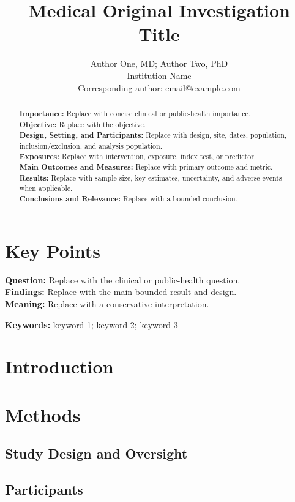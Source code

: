 \documentclass[11pt]{article}
\title{Medical Original Investigation Title}
\author{Author One, MD; Author Two, PhD\\Institution Name\\Corresponding author: email@example.com}
\date{}
\begin{document}
\maketitle

\section*{Key Points}
\textbf{Question:} Replace with the clinical or public-health question.\\
\textbf{Findings:} Replace with the main bounded result and design.\\
\textbf{Meaning:} Replace with a conservative interpretation.

\begin{abstract}
\textbf{Importance:} Replace with concise clinical or public-health importance.\\
\textbf{Objective:} Replace with the objective.\\
\textbf{Design, Setting, and Participants:} Replace with design, site, dates, population, inclusion/exclusion, and analysis population.\\
\textbf{Exposures:} Replace with intervention, exposure, index test, or predictor.\\
\textbf{Main Outcomes and Measures:} Replace with primary outcome and metric.\\
\textbf{Results:} Replace with sample size, key estimates, uncertainty, and adverse events when applicable.\\
\textbf{Conclusions and Relevance:} Replace with a bounded conclusion.
\end{abstract}

\noindent\textbf{Keywords:} keyword 1; keyword 2; keyword 3

\section{Introduction}

\section{Methods}

\subsection{Study Design and Oversight}

\subsection{Participants}
\end{document}
